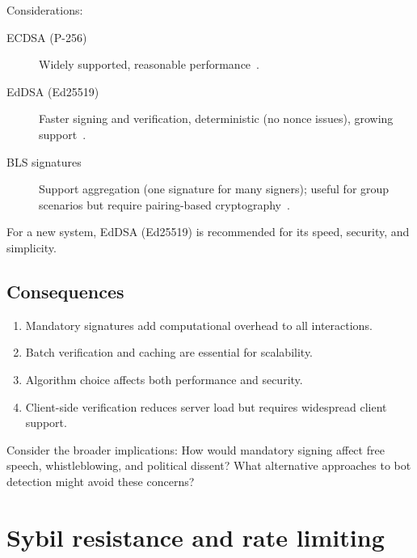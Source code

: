 Considerations:
\begin{description}
  \item[ECDSA (P-256)] Widely supported, reasonable
    performance~\autocite{FIPS186-5}.
  \item[EdDSA (Ed25519)] Faster signing and verification, deterministic
    (no nonce issues), growing support~\autocite{Ed25519}.
  \item[BLS signatures] Support aggregation (one signature for many
    signers); useful for group scenarios but require pairing-based
    cryptography~\autocite{BLS2001}.
\end{description}

For a new system, EdDSA (Ed25519) is recommended for its speed,
security, and simplicity.

\subsection{Consequences}

\begin{enumerate}
  \item Mandatory signatures add computational overhead to all
    interactions.
  \item Batch verification and caching are essential for scalability.
  \item Algorithm choice affects both performance and security.
  \item Client-side verification reduces server load but requires
    widespread client support.
\end{enumerate}


\begin{exercise}
  Consider the broader implications: How would mandatory signing affect
  free speech, whistleblowing, and political dissent?
  What alternative approaches to bot detection might avoid these
  concerns?
\end{exercise}


\section{Sybil resistance and rate limiting}\label{BotSybilResistance}



